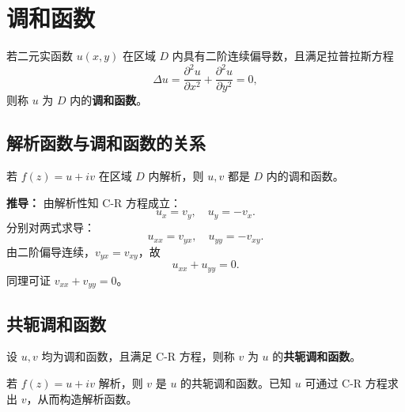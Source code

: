 	\section{调和函数}
	\begin{tcolorbox}[title=定义：调和函数, colframe=blue!50!black, colback=blue!5!white, sharp corners]
		若二元实函数 \(u(x,y)\) 在区域 \(D\) 内具有二阶连续偏导数，且满足拉普拉斯方程
		\[
		\Delta u=\frac{\partial^2 u}{\partial x^2}+\frac{\partial^2 u}{\partial y^2}=0,
		\]
		则称 \(u\) 为 \(D\) 内的\textbf{调和函数}。
	\end{tcolorbox}
	
	\subsection{解析函数与调和函数的关系}
	\begin{tcolorbox}[title=定理：解析函数与调和函数, colframe=green!45!black, colback=green!5!white]
		若 \(f(z)=u+iv\) 在区域 \(D\) 内解析，则 \(u,v\) 都是 \(D\) 内的调和函数。
	\end{tcolorbox}
	
	\textbf{推导：}
	由解析性知 C-R 方程成立：
	\[
	u_x=v_y,\quad u_y=-v_x.
	\]
	分别对两式求导：
	\[
	u_{xx}=v_{yx},\quad u_{yy}=-v_{xy}.
	\]
	由二阶偏导连续，\(v_{yx}=v_{xy}\)，故
	\[
	u_{xx}+u_{yy}=0.
	\]
	同理可证 \(v_{xx}+v_{yy}=0\)。
	
	\subsection{共轭调和函数}
	\begin{tcolorbox}[title=定义：共轭调和函数, colframe=blue!50!black, colback=blue!5!white, sharp corners]
		设 \(u,v\) 均为调和函数，且满足 C-R 方程，则称 \(v\) 为 \(u\) 的\textbf{共轭调和函数}。
	\end{tcolorbox}
	
	若 \(f(z)=u+iv\) 解析，则 \(v\) 是 \(u\) 的共轭调和函数。已知 \(u\) 可通过 C-R 方程求出 \(v\)，从而构造解析函数。
	
